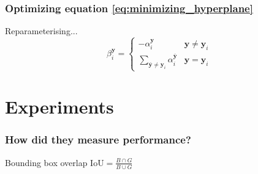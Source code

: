 \documentclass[mathserif,handout]{beamer}
\begin{document}
\begin{frame}
    \frametitle{Optimizing equation \eqref{eq:minimizing_hyperplane}}
    Reparameterising...
    \begin{equation}
        \beta_i^\mathbf{y} = \begin{cases}
                                -\alpha_i^\mathbf{y} & \mathbf{y} \ne \mathbf{y}_i \\
                                \sum_{\mathbf{\bar{y}} \ne \mathbf{y}_i} \alpha_i^\mathbf{\bar{y}} & \mathbf{y} = \mathbf{y}_i
                             \end{cases}
    \end{equation}
\end{frame}


\section{Experiments}

\begin{frame}
    \frametitle{How did they measure performance?}
    \begin{block}{Bounding box overlap}
        $\text{IoU} = \frac{B \cap G}{B \cup G}$
    \end{block}
\end{frame}
\end{document}

